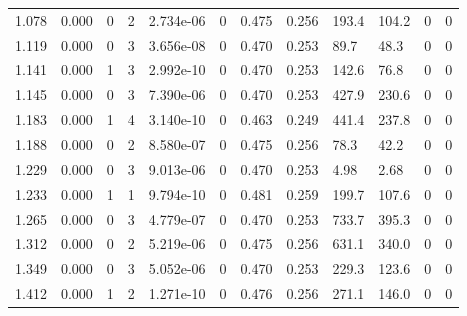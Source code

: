\documentclass[preview]{standalone}
\begin{document}
{{\begin{tabular}{L{1.2cm}C{1.2cm} C{0.3cm}C{0.5cm} C{1.4cm}C{1.4cm} C{1.4cm}C{1.4cm} C{1.6cm}C{1.6cm} C{1.6cm}C{1.6cm}}
  1.078  &  0.000  & 0     &  2 &  2.734e-06  & 0  &  0.475&   0.256& 193.4 & 104.2   &  0 & 0  \\ 
  1.119  &  0.000  & 0     &  3 &  3.656e-08  & 0  &  0.470&   0.253& 89.7 & 48.3   &  0 & 0  \\ 
  1.141  &  0.000  & 1     &  3 &  2.992e-10  & 0  &  0.470&   0.253& 142.6 & 76.8   &  0 & 0  \\ 
  1.145  &  0.000  & 0     &  3 &  7.390e-06  & 0  &  0.470&   0.253& 427.9 & 230.6   &  0 & 0  \\ 
  1.183  &  0.000  & 1     &  4 &  3.140e-10  & 0  &  0.463&   0.249& 441.4 & 237.8   &  0 & 0  \\ 
  1.188  &  0.000  & 0     &  2 &  8.580e-07  & 0  &  0.475&   0.256& 78.3 & 42.2   &  0 & 0  \\ 
  1.229  &  0.000  & 0     &  3 &  9.013e-06  & 0  &  0.470&   0.253& 4.98 & 2.68   &  0 & 0  \\ 
  1.233  &  0.000  & 1     &  1 &  9.794e-10  & 0  &  0.481&   0.259& 199.7 & 107.6   &  0 & 0  \\ 
  1.265  &  0.000  & 0     &  3 &  4.779e-07  & 0  &  0.470&   0.253& 733.7 & 395.3   &  0 & 0  \\ 
  1.312  &  0.000  & 0     &  2 &  5.219e-06  & 0  &  0.475&   0.256& 631.1 & 340.0   &  0 & 0  \\ 
  1.349  &  0.000  & 0     &  3 &  5.052e-06  & 0  &  0.470&   0.253& 229.3 & 123.6   &  0 & 0  \\ 
  1.412  &  0.000  & 1     &  2 &  1.271e-10  & 0  &  0.476&   0.256& 271.1 & 146.0   &  0 & 0  \\ 
\hline 
\end{tabular} 

}}
\end{document}
